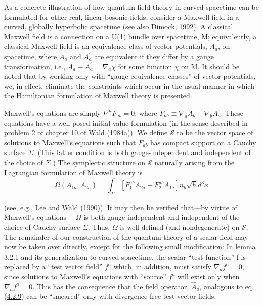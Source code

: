 \documentclass[11pt,a4paper]{article}
\begin{document}
As a concrete illustration of how quantum field theory in curved spacetime can be formulated for other real, linear bosonic fields, consider a Maxwell field in a curved, globally hyperbolic spacetime (see also Dimock, 1992). A classical Maxwell field is a connection on a U(1) bundle over spacetime, M; equivalently, a classical Maxwell field is an equivalence class of vector potentials, \(A_a\), on spacetime, where \(A_a\) and \(A^\prime_a\) are equivalent if they differ by a gauge transformation, i.e., \(A_a-A^\prime_a=\nabla_a\chi\) for some function \(\chi\) on M. It should be noted that by working only with ``gauge equivalence classes'' of vector potentials, we, in effect, eliminate the constraints which occur in the usual manner in which the Hamiltonian formulation of Maxwell theory is presented.

Maxwell's equations are simply \(\nabla^a F_{ab} = 0\), where \(F_{ab} \equiv \nabla_a A_b - \nabla_b A_a\). These equations have a well posed initial value formulation (in the sense described in problem 2 of chapter 10 of Wald (1984a)). We define \(\mathcal{S}\) to be the vector space of solutions to Maxwell's equations such that \(F_{ab}\) has compact support on a Cauchy surface \(\Sigma\). (This latter condition is both gauge-independent and independent of the choice of \(\Sigma\).) The symplectic structure on \(\mathcal{S}\) naturally arising from the Lagrangian formulation of Maxwell theory is
\begin{equation*}
\Omega(A_{1a}, A_{2a}) = \int_{\Sigma} [F_1^{ab} A_{2a} - F_2^{ab} A_{1a}] n_b \sqrt{h} d^3x \tag{4.7.1}\label{eq:4.7.1}
\end{equation*}

(see, e.g., Lee and Wald (1990)). It may then be verified that---by virtue of Maxwell's equations--- \(\Omega\) is both gauge independent and independent of the choice of Cauchy surface \(\Sigma\). Thus, \(\Omega\) is well defined (and nondegenerate) on \(\mathcal{S}\). The remainder of our construction of the quantum theory of a scalar field may now be taken over directly, except for the following small modification: In lemma 3.2.1 and its generalization to curved spacetime, the scalar ``test function'' f is replaced by a ``test vector field'' \(f^a\) which, in addition, must satisfy \(\nabla_a f^a = 0\), since solutions to Maxwell's equations with ``source'' \(f^a\) will exist only when \(\nabla_a f^a = 0\). This has the consequence that the field operator, \(\hat{A}_a\), analogous to eq. (\hyperref[eq:4.2.9]{4.2.9}) can be ``smeared'' only with divergence-free test vector fields.
\end{document}
